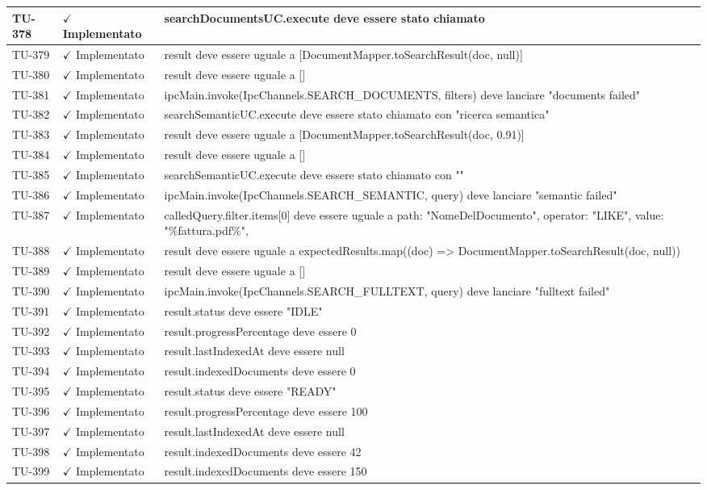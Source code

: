 ﻿\documentclass[a4paper,12pt]{article}
\newcommand{\ok}{\textcolor{green!60!black}{$\checkmark$ Implementato}}
\begin{document}
\begin{longtable}{|p{2cm}|p{3.5cm}|p{9.5cm}|}
\hline
TU-378 & \ok & searchDocumentsUC.execute deve essere stato chiamato \\
\hline
TU-379 & \ok & result deve essere uguale a [DocumentMapper.toSearchResult(doc, null)] \\
\hline
TU-380 & \ok & result deve essere uguale a [] \\
\hline
TU-381 & \ok & ipcMain.invoke(IpcChannels.SEARCH\_DOCUMENTS, filters) deve lanciare "documents failed" \\
\hline
TU-382 & \ok & searchSemanticUC.execute deve essere stato chiamato con "ricerca semantica" \\
\hline
TU-383 & \ok & result deve essere uguale a [DocumentMapper.toSearchResult(doc, 0.91)] \\
\hline
TU-384 & \ok & result deve essere uguale a [] \\
\hline
TU-385 & \ok & searchSemanticUC.execute deve essere stato chiamato con "" \\
\hline
TU-386 & \ok & ipcMain.invoke(IpcChannels.SEARCH\_SEMANTIC, query) deve lanciare "semantic failed" \\
\hline
TU-387 & \ok & calledQuery.filter.items[0] deve essere uguale a { path: "NomeDelDocumento", operator: "LIKE", value: "\%fattura.pdf\%", } \\
\hline
TU-388 & \ok & result deve essere uguale a expectedResults.map((doc) => DocumentMapper.toSearchResult(doc, null)) \\
\hline
TU-389 & \ok & result deve essere uguale a [] \\
\hline
TU-390 & \ok & ipcMain.invoke(IpcChannels.SEARCH\_FULLTEXT, query) deve lanciare "fulltext failed" \\
\hline
TU-391 & \ok & result.status deve essere "IDLE" \\
\hline
TU-392 & \ok & result.progressPercentage deve essere 0 \\
\hline
TU-393 & \ok & result.lastIndexedAt deve essere null \\
\hline
TU-394 & \ok & result.indexedDocuments deve essere 0 \\
\hline
TU-395 & \ok & result.status deve essere "READY" \\
\hline
TU-396 & \ok & result.progressPercentage deve essere 100 \\
\hline
TU-397 & \ok & result.lastIndexedAt deve essere null \\
\hline
TU-398 & \ok & result.indexedDocuments deve essere 42 \\
\hline
TU-399 & \ok & result.indexedDocuments deve essere 150 \\

\end{longtable}
\end{document}
